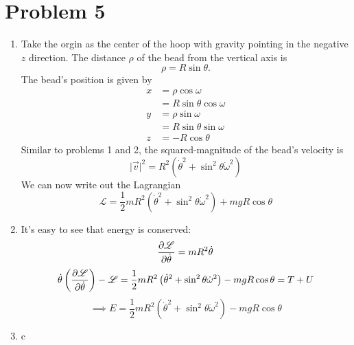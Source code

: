 \documentclass[12pt]{article}
\newcommand{\magsq}[1]{\big|#1\big|^2}
\begin{document}
\section*{Problem 5}
\begin{enumerate}[label=(\alph*)]
    \item Take the orgin as the center of the hoop with gravity pointing in the negative $z$ direction. The distance $\rho$ of the bead from the vertical axis is 
    \[ \rho = R\sin\theta. \]
    The bead's position is given by
    \begin{align*}
        x &= \rho\cos\omega \\
        &= R\sin\theta\cos\omega \\
        y &= \rho\sin\omega \\
        &= R\sin\theta\sin\omega \\
        z &= -R\cos\theta
    \end{align*}
    Similar to problems 1 and 2, the squared-magnitude of the bead's velocity is
    \[ \magsq{\vec{v}} = R^2\left(\dot{\theta}^2 + \sin^2\theta\dot{\omega}^2\right) \]
    We can now write out the Lagrangian
    \[ \boxed{\mathscr{L} = \frac{1}{2}mR^2\left(\dot{\theta}^2 + \sin^2\theta\dot{\omega}^2\right) + mgR\cos\theta} \]

    \item It's easy to see that energy is conserved:
    \[ \pdv{\mathscr{L}}{\dot{\theta}} = mR^2\dot{\theta} \]
    \[ \dot{\theta}\left(\pdv{\mathscr{L}}{\dot{\theta}}\right) - \mathscr{L} = \frac{1}{2}mR^2\left(\dot{\theta}^2 + \sin^2\theta\dot{\omega}^2\right) - mgR\cos\theta = T + U\]
    \[ \implies \boxed{E = \frac{1}{2}mR^2\left(\dot{\theta}^2 + \sin^2\theta\dot{\omega}^2\right) - mgR\cos\theta} \]

    \item c    
\end{enumerate}
\end{document}
